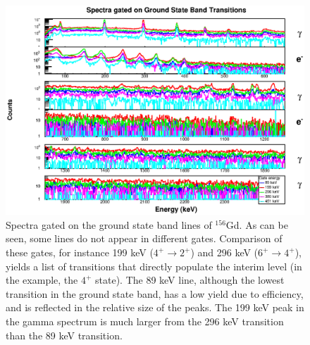 \begin{figure}[!]
    \centering
    \includegraphics[scale=0.8]{156GdTablesAndFigs/156Gd_stacked.eps}
    \caption{Spectra gated on the ground state band lines of $^{156}$Gd. As can be seen, some lines do not appear in different gates. Comparison of these gates, for instance 199 keV ($4^+\rightarrow2^+$) and 296 keV ($6^+\rightarrow4^+$), yields a list of transitions that directly populate the interim level (in the example, the $4^+$ state). The 89 keV line, although the lowest transition in the ground state band, has a low yield due to efficiency, and is reflected in the relative size of the peaks. The 199 keV peak in the gamma spectrum is much larger from the 296 keV transition than the 89 keV transition.}
    \label{fig:156_GS_Gate}
\end{figure}
